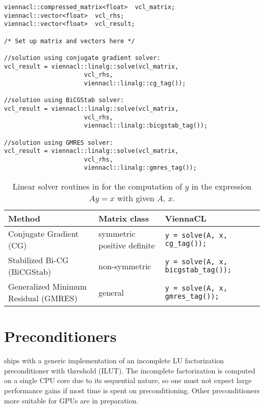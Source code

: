 


\begin{lstlisting}
viennacl::compressed_matrix<float>  vcl_matrix;
viennacl::vector<float>  vcl_rhs;
viennacl::vector<float>  vcl_result;

/* Set up matrix and vectors here */

//solution using conjugate gradient solver:
vcl_result = viennacl::linalg::solve(vcl_matrix,
				      vcl_rhs,
				      viennacl::linalg::cg_tag());

//solution using BiCGStab solver:
vcl_result = viennacl::linalg::solve(vcl_matrix,
				      vcl_rhs,
				      viennacl::linalg::bicgstab_tag());

//solution using GMRES solver:
vcl_result = viennacl::linalg::solve(vcl_matrix,
				      vcl_rhs,
				      viennacl::linalg::gmres_tag());
\end{lstlisting}

\begin{table}[tb]
\begin{center}
\renewcommand{\arraystretch}{1.2}
\begin{tabular}{p{4cm}|p{3cm}|p{7.5cm}}
Method & Matrix class & ViennaCL\\
\hline
Conjugate Gradient (CG) & symmetric positive definite & \texttt{y = solve(A, x, cg\_tag());} \\
Stabilized Bi-CG (BiCGStab) & non-symmetric & \texttt{y = solve(A, x, bicgstab\_tag());} \\
Generalized Minimum Residual (GMRES) & general & \texttt{y = solve(A, x, gmres\_tag());} \\
\hline
\end{tabular}
\caption{Linear solver routines in {\ViennaCL} for the computation of $y$ in the expression $Ay = x$ with given $A$, $x$.}
\label{tab:linear-solvers}
\end{center}
\end{table}


\section{Preconditioners}
{\ViennaCL} ships with a generic implementation of an incomplete LU factorization preconditioner with threshold (ILUT). The incomplete factorization is computed on a single CPU core due to its sequential nature, so one must not expect large performance gains if most time is spent on preconditioning. Other preconditioners more suitable for GPUs are in preparation.

